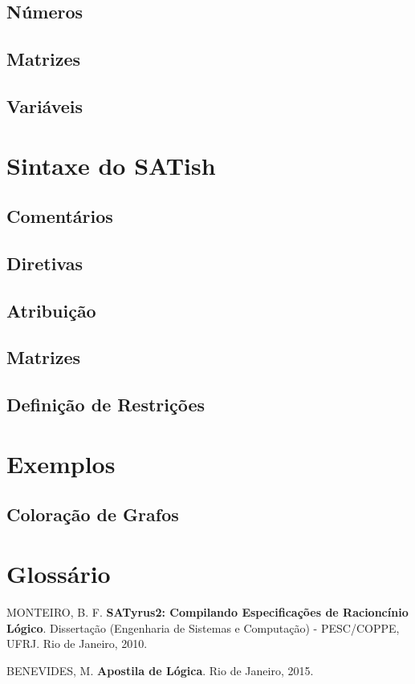 \documentclass[12pt]{satyrus}
\begin{document}
    \section{Números}
    
    \section{Matrizes}
    
    \section{Variáveis}
    
    \chapter{Sintaxe do SATish}
    
    \section{Comentários}
    
    \section{Diretivas}
    
    \section{Atribuição}
    
    \section{Matrizes}
    
    \section{Definição de Restrições}
    
    \chapter{Exemplos}
    
    \section{Coloração de Grafos}
    
    \chapter*{Glossário}
    
    \begin{thebibliography}{20}
    	 MONTEIRO, B. F. \textbf{SATyrus2: Compilando Especificações de Racioncínio Lógico}. Dissertação (Engenharia de Sistemas e Computação) - PESC/COPPE, UFRJ. Rio de Janeiro, 2010.
    	
    	 BENEVIDES, M. \textbf{Apostila de Lógica}. Rio de Janeiro, 2015.
    \end{thebibliography}
    
\end{document}
